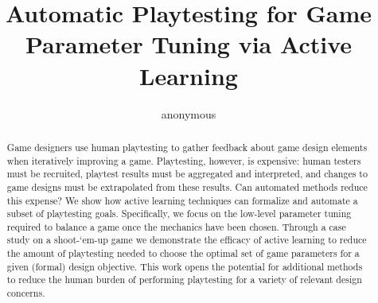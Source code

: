 \documentclass{sig-alternate}
\begin{document}
%

\title{Automatic Playtesting for Game Parameter Tuning via Active Learning}



\author{
\alignauthor
anonymous
%
}


\maketitle
\begin{abstract}
Game designers use human playtesting to gather feedback about game design elements when iteratively improving a game.
Playtesting, however, is expensive: human testers must be recruited, playtest results must be aggregated and interpreted, and changes to game designs must be extrapolated from these results.
Can automated methods reduce this expense?
We show how active learning techniques can formalize and automate a subset of playtesting goals.
Specifically, we focus on the low-level parameter tuning required to balance a game once the mechanics have been chosen.
Through a case study on a shoot-`em-up game we demonstrate the efficacy of active learning to reduce the amount of playtesting needed to choose the optimal set of game parameters for a given (formal) design objective.
This work opens the potential for additional methods to reduce the human burden of performing playtesting for a variety of relevant design concerns.
\end{abstract}
\end{document}
